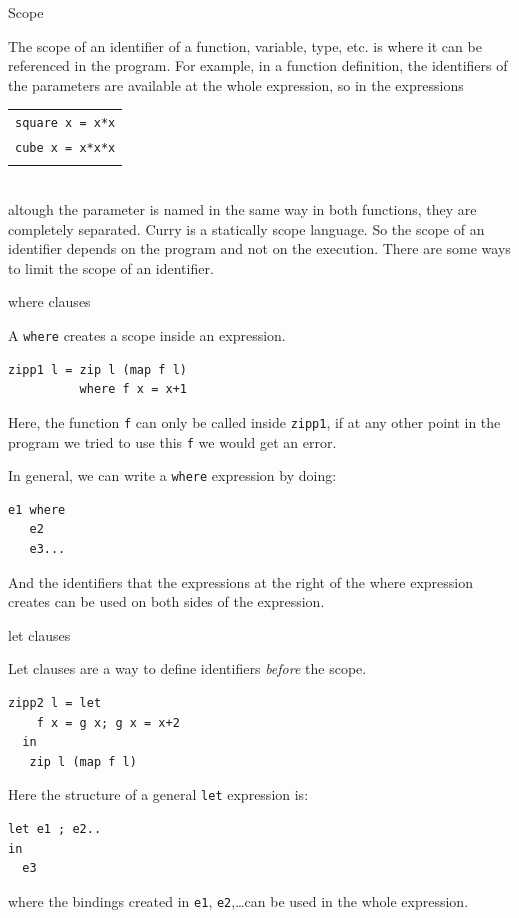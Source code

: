 \documentclass{beamer}
\newcommand{\q}[1]{\texttt{#1}}
\begin{document}
\begin{section}{Scope}
  \begin{frame}
  The scope of an identifier of a function, variable, type, etc. is where it can be referenced in the program.
  For example, in a function definition, the identifiers of the parameters are available at the whole expression, so in the expressions

  \begin{tabular}[c]{l}
    \\
    \q{square x = x*x}\\
    \q{cube x = x*x*x}\\
    \\
    
  \end{tabular}\\

  
  altough the parameter is named in the same way in both functions, they are completely separated. Curry is a statically scope language. So the scope of an identifier depends on the program and not on the execution. There are some ways to limit the scope of an identifier.
\end{frame}
\begin{subsection}{where clauses}
\begin{frame}
[fragile]
    A \q{where} creates a scope inside an expression.
\begin{verbatim}
zipp1 l = zip l (map f l)
          where f x = x+1
\end{verbatim}

    Here, the function \q{f} can only be called inside \q{zipp1}, if at any other point in the program we tried to use this \q{f} we would get an error.

    In general, we can write a \q{where} expression  by doing:
\begin{verbatim}
e1 where
   e2
   e3...
\end{verbatim}
    And the identifiers that the expressions at the right of the where expression creates can be used on both sides of the expression.
\end{frame}
\end{subsection}
\begin{subsection}{let clauses}
  \begin{frame}
[fragile]

Let clauses are a way to define identifiers \textit{before} the scope.

\begin{verbatim}
zipp2 l = let
    f x = g x; g x = x+2
  in
   zip l (map f l)
\end{verbatim}
    Here the structure of a general \q{let} expression is:
    
\begin{verbatim}
let e1 ; e2..
in
  e3
\end{verbatim}
    where the bindings created in \q{e1}, \q{e2},\ldots can be used in the whole expression.
\end{frame}
\end{subsection}
  
\end{section}
\end{document}
